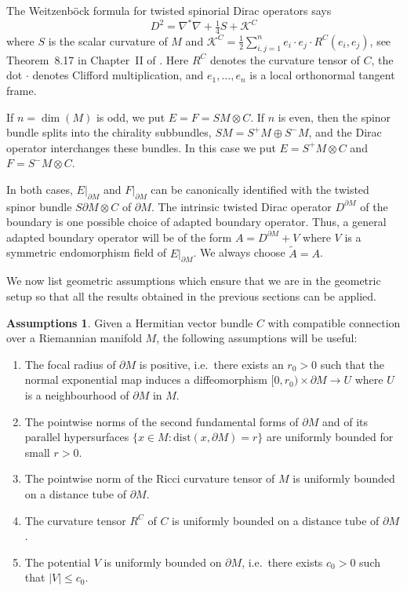 \documentclass[a4paper,10pt,reqno]{amsart}
\newcommand{\KK}{\mathscr{K}}
\newcommand{\dM}{\partial M}
\theoremstyle{definition}
\newtheorem{assumptions}[theorem]{Assumptions}
\begin{document}
The Weitzenböck formula for twisted spinorial Dirac operators says
\begin{equation}
D^2 = \nabla^*\nabla + \tfrac14 S + \KK^C
\label{eq:Weitzen}
\end{equation}
where $S$ is the scalar curvature of $M$ and $\KK^C = \tfrac12 \sum_{i,j=1}^{n} e_i\cdot e_j\cdot R^C(e_i,e_j)$, see Theorem~8.17 in Chapter~II of \cite{LM}.
Here $R^C$ denotes the curvature tensor of $C$, the dot $\cdot$ denotes Clifford multiplication, and $e_1,\dots,e_n$ is a local orthonormal tangent frame.

If $n=\dim(M)$ is odd, we put $E=F=SM\otimes C$.
If $n$ is even, then the spinor bundle splits into the chirality subbundles, $SM=S^+M\oplus S^-M$, and the Dirac operator interchanges these bundles.
In this case we put $E=S^+M\otimes C$ and $F=S^-M\otimes C$.

In both cases, $E|_{\dM}$ and $F|_{\dM}$ can be canonically identified with the twisted spinor bundle $S\dM\otimes C$ of $\dM$.
The intrinsic twisted Dirac operator $D^{\dM}$ of the boundary is one possible choice of adapted boundary operator.
Thus, a general adapted boundary operator will be of the form $A=D^{\dM} + V$ where $V$ is a symmetric endomorphism field of $E|_{\dM}$.
We always choose $\tilde A=A$.

We now list geometric assumptions which ensure that we are in the geometric setup so that all the results obtained in the previous sections can be applied.

\begin{assumptions}\label{DiracAssumptions}
Given a Hermitian vector bundle $C$ with compatible connection over a Riemannian manifold $M$, the following assumptions will be useful:
\begin{enumerate}[label=(A\arabic*), labelwidth=0pt, labelindent=2pt, leftmargin=26pt]
\item \label{eq:Hyp:DiracFocal}
      The focal radius of $\dM$ is positive, i.e.\ there exists an $r_0>0$ such that the normal exponential map induces a diffeomorphism $[0,r_0)\times\dM \to U$ where $U$ is a neighbourhood of $\dM$ in $M$.
\item \label{eq:Hyp:DiracFundamental}
      The pointwise norms of the second fundamental forms of $\dM$ and of its parallel hypersurfaces $\{x\in M : \mathrm{dist}(x,\dM)=r\}$ are uniformly bounded for small $r>0$.
\item \label{eq:Hyp:DiracRicci}
      The pointwise norm of the Ricci curvature tensor of $M$ is uniformly bounded on a distance tube of $\dM$.
\item \label{eq:Hyp:DiracTwist}
      The curvature tensor $R^C$ of $C$ is uniformly bounded on a distance tube of $\dM$.
\item \label{eq:Hyp:DiracV}
      The potential $V$ is uniformly bounded on $\dM$, i.e.\ there exists $c_0>0$ such that $|V|\le c_0$.
\end{enumerate}
\end{assumptions}
\end{document}
